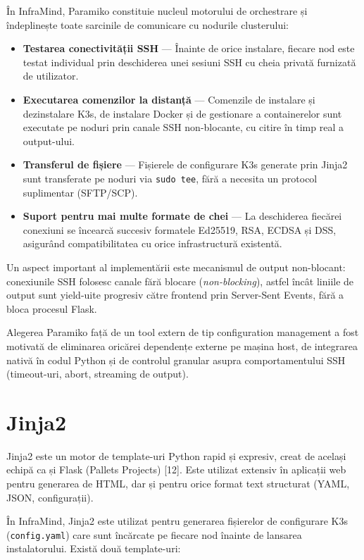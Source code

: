 \documentclass[12pt,a4paper]{report}
\begin{document}
În InfraMind, Paramiko constituie nucleul motorului de orchestrare și îndeplinește toate sarcinile de comunicare cu nodurile clusterului:

\begin{itemize}
  \item \textbf{Testarea conectivității SSH} — Înainte de orice instalare, fiecare nod este testat individual prin deschiderea unei sesiuni SSH cu cheia privată furnizată de utilizator.
  \item \textbf{Executarea comenzilor la distanță} — Comenzile de instalare și dezinstalare K3s, de instalare Docker și de gestionare a containerelor sunt executate pe noduri prin canale SSH non-blocante, cu citire în timp real a output-ului.
  \item \textbf{Transferul de fișiere} — Fișierele de configurare K3s generate prin Jinja2 sunt transferate pe noduri via \texttt{sudo tee}, fără a necesita un protocol suplimentar (SFTP/SCP).
  \item \textbf{Suport pentru mai multe formate de chei} — La deschiderea fiecărei conexiuni se încearcă succesiv formatele Ed25519, RSA, ECDSA și DSS, asigurând compatibilitatea cu orice infrastructură existentă.
\end{itemize}

Un aspect important al implementării este mecanismul de output non-blocant: conexiunile SSH folosesc canale fără blocare (\textit{non-blocking}), astfel încât liniile de output sunt yield-uite progresiv către frontend prin Server-Sent Events, fără a bloca procesul Flask.

Alegerea Paramiko față de un tool extern de tip configuration management a fost motivată de eliminarea oricărei dependențe externe pe mașina host, de integrarea nativă în codul Python și de controlul granular asupra comportamentului SSH (timeout-uri, abort, streaming de output).

\section{Jinja2}

Jinja2 este un motor de template-uri Python rapid și expresiv, creat de același echipă ca și Flask (Pallets Projects) [12]. Este utilizat extensiv în aplicații web pentru generarea de HTML, dar și pentru orice format text structurat (YAML, JSON, configurații).

În InfraMind, Jinja2 este utilizat pentru generarea fișierelor de configurare K3s (\texttt{config.yaml}) care sunt încărcate pe fiecare nod înainte de lansarea instalatorului. Există două template-uri:
\end{document}
